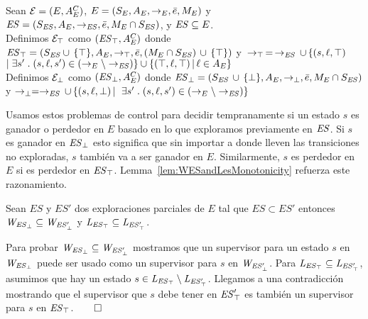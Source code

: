 \begin{definition}
 \label{def:unexploredTo}

Sean $\mathcal{E} = (E, A_E^C)$, $E = (S_E,A_E,\rightarrow_E,\bar{e},M_E)$ y $\mathit{ES} = 
(S_{\mathit{ES}},A_E, \rightarrow_{\mathit{ES}},\bar{e},M_E \cap S_{\mathit{ES}})$, y $\mathit{ES} 
\subseteq E$.
\\
Definimos $\mathcal{E}_\top$ como $(\mathit{\mathit{ES}_{\top}}, A_E^C)$ donde 
$\mathit{\mathit{ES}_{\top}} = (S_{\mathit{ES}} \cup \, \{\top\},A_E,\rightarrow_\top, 
\bar{e}, 
(M_E \cap S_{\mathit{ES}})\, \cup \, \{\top\})$ y $\, \rightarrow_\top \, = \, \rightarrow_{\mathit{ES}} 
\, 
\cup\, \{(s,\ell, \top) 
\;$ $ | \; \exists s' \;.\; (s, \ell, s') \in (\rightarrow_E \setminus \rightarrow_{\mathit{ES}})\} \cup \{(\top, \ell, \top) \, | \, \ell \in A_E\}$ \\
Definimos $\mathcal{E}_\bot$ como $(\mathit{\mathit{ES}_{\bot}}, A_E^C)$ donde 
$\mathit{\mathit{ES}_{\bot}} = (S_{\mathit{ES}} \, \cup \, 
\{\bot\},A_E,\rightarrow_\bot, 
\bar{e}, M_E \cap S_{\mathit{ES}})$ y $\rightarrow_\bot = \rightarrow_{\mathit{ES}} \, \cup \, \{(s,\ell, 
\bot) \, | \, $ $ \exists s' \;.\; (s, \ell, s') \in (\rightarrow_E \setminus \rightarrow_{\mathit{ES}})\}$ 
\end{definition}

Usamos estos problemas de control para decidir tempranamente si un estado $s$ es ganador o perdedor en $E$ basado en lo que exploramos previamente en $\mathit{ES}$. Si $s$ es ganador en $\mathit{\mathit{ES}_{\bot}}$ esto significa que sin importar a donde lleven las transiciones no exploradas, $s$ también va a ser ganador en $E$. Similarmente, $s$ es perdedor en $E$ si es perdedor en $\mathit{\mathit{ES}_{\top}}$.
Lemma~\ref{lem:WESandLesMonotonicity} refuerza este razonamiento.


\begin{lemma}
\label{lem:WESandLesMonotonicity}
Sean $ES$ y $ES'$ dos exploraciones parciales de $E$ tal que $ES 
\subset ES'$ entonces $\mathit{W_{\mathit{\mathit{ES}_{\bot}}}} \subseteq \mathit{W_{\mathit{\mathit{ES}'_{\bot}}}}$ y $\mathit{L_{\mathit{\mathit{ES}_{\top}}}} \subseteq 
\mathit{L_{\mathit{\mathit{ES}'_{\top}}}}$.
\end{lemma}

\begin{Proof Sketch}
Para probar $\mathit{W_{\mathit{\mathit{ES}_{\bot}}}} \subseteq \mathit{W_{\mathit{\mathit{ES}'_{\bot}}}}$ mostramos que un supervisor para un estado $s$ en $\mathit{W_{\mathit{\mathit{ES}_{\bot}}}}$ 
puede ser usado como un supervisor para $s$ en $\mathit{W_{\mathit{\mathit{ES}'_{\bot}}}}$. Para $\mathit{L_{\mathit{\mathit{ES}_{\top}}}} \subseteq 
\mathit{L_{\mathit{\mathit{ES}'_{\top}}}}$, asumimos que hay un estado $s \in \mathit{L_{\mathit{\mathit{ES}_{\top}}}} \setminus \mathit{L_{\mathit{\mathit{ES}'_{\top}}}} $. Llegamos a una contradicción mostrando que el supervisor que $s$ debe tener en
$\mathit{\mathit{ES}'_{\top}}$ es también un supervisor para $s$ en $\mathit{\mathit{ES}_{\top}}$.\hfill$\qed$
\end{Proof Sketch}

